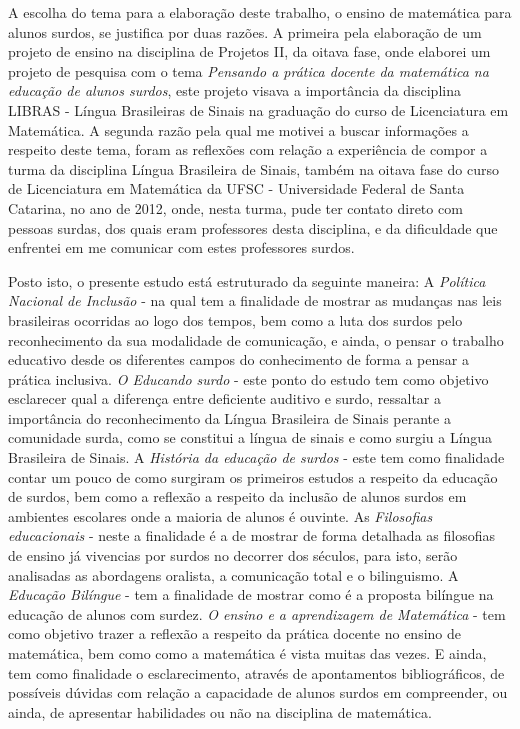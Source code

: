 \documentclass[brasil]{abnt}
\begin{document}
	A escolha do tema para a elaboração deste trabalho, o ensino de matemática para alunos surdos, se justifica por duas razões. A primeira pela elaboração de um projeto de ensino na 
	disciplina de Projetos II, da oitava fase, onde elaborei um projeto de pesquisa com o tema \textit{Pensando a prática docente da matemática na educação de alunos surdos}, este projeto visava a importância 
	da disciplina LIBRAS - Língua Brasileiras de Sinais na graduação do curso de Licenciatura em Matemática. A segunda razão pela qual me motivei a buscar informações a respeito deste tema, foram as reflexões 
	com relação a experiência de compor a turma da disciplina Língua Brasileira de Sinais, também na oitava fase do curso de Licenciatura em Matemática da UFSC - Universidade Federal de Santa Catarina, no ano 
	de 2012, onde, nesta turma, pude ter contato direto com pessoas surdas, dos quais eram professores desta disciplina, e da dificuldade que enfrentei em me comunicar com estes professores surdos. 
	
	Posto isto, o presente estudo está estruturado da seguinte maneira: A \textit{Política Nacional de Inclusão} - na qual tem a finalidade de mostrar as mudanças nas leis brasileiras ocorridas ao logo dos 
	tempos, bem como a luta dos surdos pelo reconhecimento da sua modalidade de comunicação, e ainda, o pensar o trabalho educativo desde os diferentes campos do conhecimento de forma a pensar a prática 
	inclusiva. \textit{O Educando surdo} - este ponto do estudo tem como objetivo esclarecer qual a diferença entre deficiente auditivo e surdo, ressaltar a importância do reconhecimento da Língua Brasileira de Sinais 
	perante a comunidade surda, como se constitui a língua de sinais e como surgiu a Língua Brasileira de Sinais. A \textit{História da educação de surdos} - este tem como finalidade contar um pouco 
	de como surgiram os primeiros estudos a respeito da educação de surdos, bem como a reflexão a respeito da inclusão de alunos surdos em ambientes escolares onde a maioria de alunos é ouvinte. As 
	\textit{Filosofias educacionais} - neste a finalidade é a de mostrar de forma detalhada as filosofias de ensino já vivencias por surdos no decorrer dos séculos, para isto, serão analisadas as abordagens oralista, 
	a comunicação total e o bilinguismo. A \textit{Educação Bilíngue} - tem a finalidade de mostrar como é a proposta bilíngue na educação de alunos com surdez. \textit{O ensino e a aprendizagem de Matemática} - tem como 
	objetivo trazer a reflexão a respeito da prática docente no ensino de matemática, bem como como a matemática é vista muitas das vezes. E ainda, tem como finalidade o esclarecimento, através de apontamentos bibliográficos, de possíveis
	dúvidas com relação a capacidade de alunos surdos em compreender, ou ainda, de apresentar habilidades ou não na disciplina de matemática.  
\end{document}
